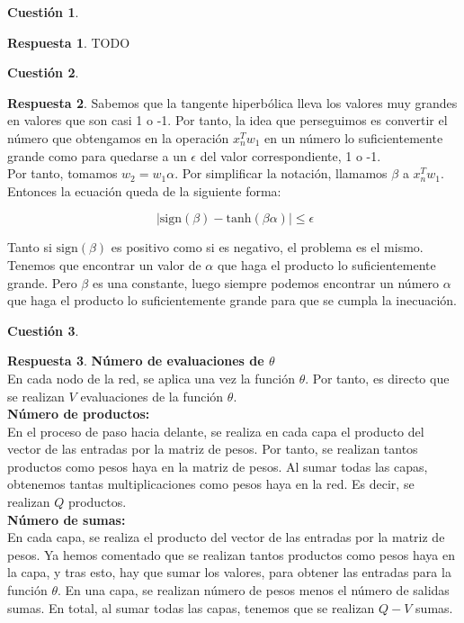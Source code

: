 \documentclass[10pt,a4paper]{article}
\theoremstyle{definition}
\newtheorem{cuestion}{Cuestión}
\newtheorem*{respuesta}{Respuesta}
\begin{document}
\begin{cuestion}
\end{cuestion}
\begin{respuesta}
TODO
\end{respuesta}

\begin{cuestion}
\end{cuestion}
\begin{respuesta}
Sabemos que la tangente hiperbólica lleva los valores muy grandes en valores que son casi 1 o -1. Por tanto, la idea que perseguimos es convertir el número que obtengamos en la operación $x_n^Tw_1$ en un número lo suficientemente grande como para quedarse a un $\epsilon$ del valor correspondiente, 1 o -1.\\

Por tanto, tomamos $w_2 =  w_1 \alpha$. Por simplificar la notación, llamamos $\beta$ a $x_n^Tw_1$. Entonces la ecuación queda de la siguiente forma:

\[
\ \left| \textrm{sign}(\beta)- \textrm{tanh}(\beta \alpha)\right| \leq \epsilon
\]

Tanto si $\textrm{sign}(\beta)$ es positivo como si es negativo, el problema es el mismo. Tenemos que encontrar un valor de $\alpha$ que haga el producto lo suficientemente grande. Pero $\beta$ es una constante, luego siempre podemos encontrar un número $\alpha$ que haga el producto lo suficientemente grande para que se cumpla la inecuación. 
\end{respuesta}

\begin{cuestion}
\end{cuestion}
\begin{respuesta}

\textbf{Número de evaluaciones de $\theta$}\\
En cada nodo de la red, se aplica una vez la función $\theta$. Por tanto, es directo que se realizan $V$ evaluaciones de la función $\theta$.\\

\textbf{Número de productos:}\\
En el proceso de paso hacia delante, se realiza en cada capa el producto del vector de las entradas por la matriz de pesos. Por tanto, se realizan tantos productos como pesos haya en la matriz de pesos. Al sumar todas las capas, obtenemos tantas multiplicaciones como pesos haya en la red. Es decir, se realizan $Q$ productos.\\

\textbf{Número de sumas:}\\
En cada capa, se realiza el producto del vector de las entradas por la matriz de pesos. Ya hemos comentado que se realizan tantos productos como pesos haya en la capa, y tras esto, hay que sumar los valores, para obtener las entradas para la función $\theta$. En una capa, se realizan número de pesos menos el número de salidas sumas. En total, al sumar todas las capas, tenemos que se realizan $Q-V$ sumas.\\


\end{respuesta}
\end{document}
